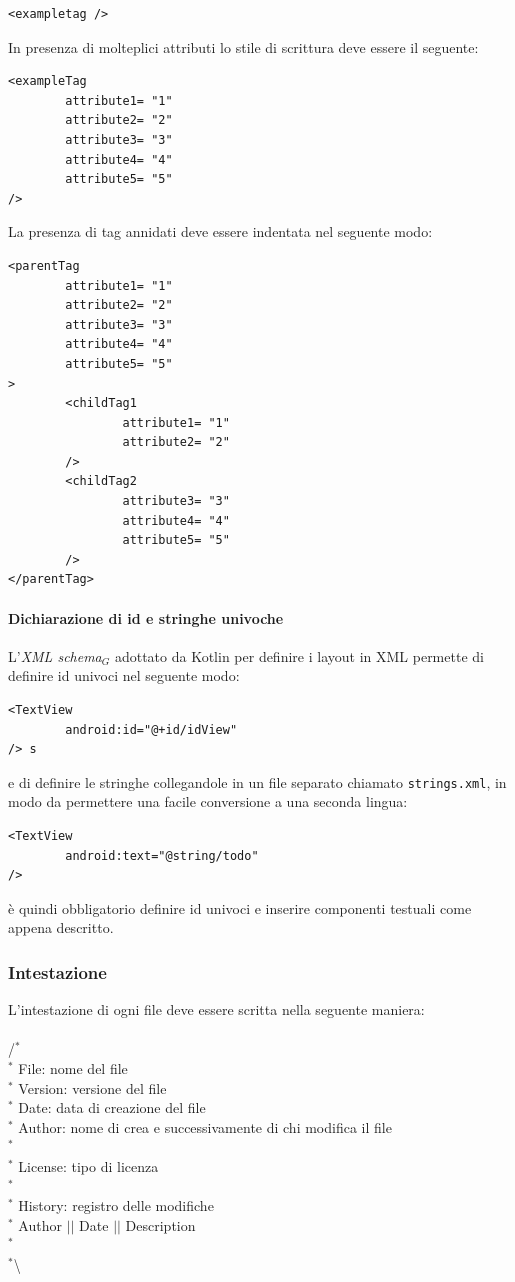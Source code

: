 \begin{lstlisting}
<exampletag />
\end{lstlisting}

In presenza di molteplici attributi lo stile di scrittura deve essere il seguente:

\begin{lstlisting}
<exampleTag 
		attribute1= "1"
		attribute2= "2"
		attribute3= "3"
		attribute4= "4"
		attribute5= "5"
/>
\end{lstlisting}

La presenza di tag annidati deve essere indentata nel seguente modo:
\begin{lstlisting}
<parentTag
		attribute1= "1"
		attribute2= "2"
		attribute3= "3"
		attribute4= "4"
		attribute5= "5"
> 
		<childTag1
				attribute1= "1"
				attribute2= "2"
		/>	
		<childTag2
				attribute3= "3"
				attribute4= "4"
				attribute5= "5"
		/>
</parentTag>
\end{lstlisting}

\paragraph{Dichiarazione di id e stringhe univoche} 
L'\textit{XML schema$_{G}$} adottato da Kotlin per definire i layout in XML permette di definire id univoci nel seguente modo: 

\begin{lstlisting}
<TextView
		android:id="@+id/idView"
/> s
\end{lstlisting}
e di definire le stringhe collegandole in un file separato chiamato \texttt{strings.xml}, in modo da permettere una facile conversione a una seconda lingua:
\begin{lstlisting}
<TextView
		android:text="@string/todo"
/> 
\end{lstlisting}
 è quindi obbligatorio definire id univoci e inserire componenti testuali come appena descritto.

\subsubsection{Intestazione}
L'intestazione di ogni file deve essere scritta nella seguente maniera: \\\\
/$^{*}$\\
$^{*}$ File: nome del file \\
$^{*}$ Version: versione del file \\
$^{*}$ Date: data di creazione del file \\
$^{*}$ Author: nome di crea e successivamente di chi modifica il file \\
$^{*}$ \\
$^{*}$ License: tipo di licenza \\
$^{*}$ \\
$^{*}$ History: registro delle modifiche \\
$^{*}$ Author $\vert$$\vert$ Date $\vert$$\vert$ Description \\
$^{*}$ \\
$^{*}$\textbackslash

